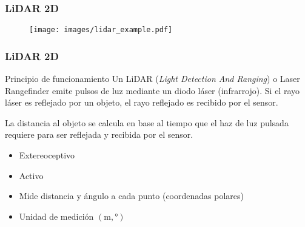 \begin{frame}
    \frametitle{LiDAR 2D}
    
    
    \begin{figure}[!h]
        \centering
        \texttt{[image: images/lidar\_example.pdf]}
    \end{figure}


\end{frame}

\begin{frame}
    \frametitle{LiDAR 2D}
    
    \begin{figure}[!h]
        \centering
    \end{figure}

    \scriptsize
    \begin{block}{Principio de funcionamiento}
     Un LiDAR (\emph{Light Detection And Ranging}) o Laser Rangefinder emite pulsos de luz mediante un diodo láser (infrarrojo). Si el rayo láser es reflejado por un objeto, el rayo reflejado es recibido por el sensor.
     
     La distancia al objeto se calcula en base al tiempo que el haz de luz pulsada requiere para ser reflejada y recibida por el sensor.
    \end{block}
    
    \begin{itemize}
        \item Extereoceptivo
        \item Activo
        \item Mide distancia y ángulo a cada punto (coordenadas polares)
        \item Unidad de medición $(\si{\meter},\si{\degree})$
    \end{itemize}


\end{frame}


